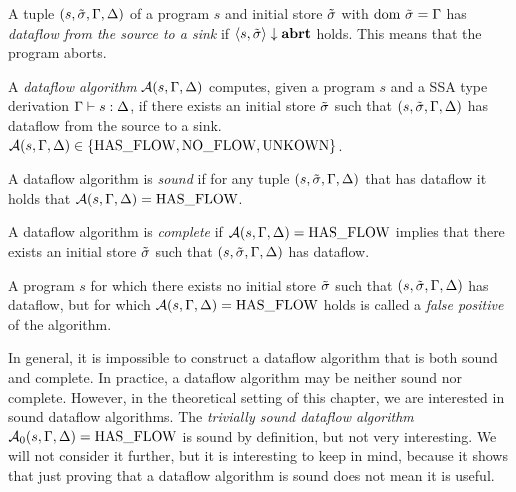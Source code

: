 \begin{definition}[Dataflow]
    A tuple $(s, \tilde{\sigma}, \Gamma, \Delta)$ of a program $s$ and initial store $\tilde{\sigma}{}$ 
    with $\text{dom }{\tilde{\sigma}{}} = \Gamma$
    has \emph{dataflow from the source to a sink} if
    $\langle s, \tilde{\sigma}{} \rangle \downarrow \textbf{abrt}$ holds.
    This means that the program aborts.
\end{definition}

\begin{definition}
    A \emph{dataflow algorithm} $\operatorname{\mathcal{A}}(s, \Gamma, \Delta)$ computes, given a program $s$
    and a SSA type derivation $\Gamma \vdash {s}: \Delta$,
    if there exists an initial store $\tilde{\sigma}{}$ 
    such that $(s, \tilde{\sigma}, \Gamma, \Delta)$ has dataflow from the source to a sink.
    $\operatorname{\mathcal{A}}(s, \Gamma, \Delta) \in \{\text{HAS\_FLOW}, \text{NO\_FLOW}, \text{UNKOWN}\}$.
\end{definition}

\begin{definition}[Soundness]
    A dataflow algorithm is \emph{sound} if for any tuple $(s, \tilde{\sigma}, \Gamma, \Delta)$ that
    has dataflow it holds that $\operatorname{\mathcal{A}}(s, \Gamma, \Delta) = \text{HAS\_FLOW}$.
\end{definition}

\begin{definition}[Completeness]
    A dataflow algorithm is \emph{complete} if $\operatorname{\mathcal{A}}(s, \Gamma, \Delta) = \text{HAS\_FLOW}$
    implies that there exists an initial store $\tilde{\sigma}$
     such that $(s, \tilde{\sigma}, \Gamma, \Delta)$ has dataflow.
\end{definition}
\begin{definition}
    A program $s$ for which there exists no initial store $\tilde{\sigma}$ such that 
    $(s, \tilde{\sigma}, \Gamma, \Delta)$ has dataflow, but for which $\operatorname{\mathcal{A}}(s, \Gamma, \Delta) = \text{HAS\_FLOW}$ holds
    is called a \emph{false positive} of the algorithm.
\end{definition}
\begin{remark}
    In general, it is impossible to construct a dataflow algorithm that is both 
    sound and complete.
    In practice, a dataflow algorithm may be neither sound nor complete.
    However, in the theoretical setting of this chapter, we are interested in 
    sound dataflow algorithms.
    The \emph{trivially sound dataflow algorithm} $\operatorname{\mathcal{A}}_0(s, \Gamma, \Delta) = \text{HAS\_FLOW}$ 
    is sound by definition, but not very interesting.
    We will not consider it further, but it is interesting to keep in mind,
    because it shows that just proving that a dataflow algorithm is sound does not
    mean it is useful.    
\end{remark}

